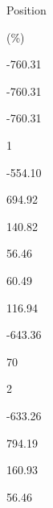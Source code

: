 \documentclass[a4paper,portrait,12pt]{article}
\begin{document}
\begin{flushleft}
Position
\end{flushleft}





(\%)





-760.31





-760.31





-760.31





1





-554.10





694.92





140.82





56.46





60.49





116.94





-643.36





70





2





-633.26





794.19





160.93





56.46
\end{document}
